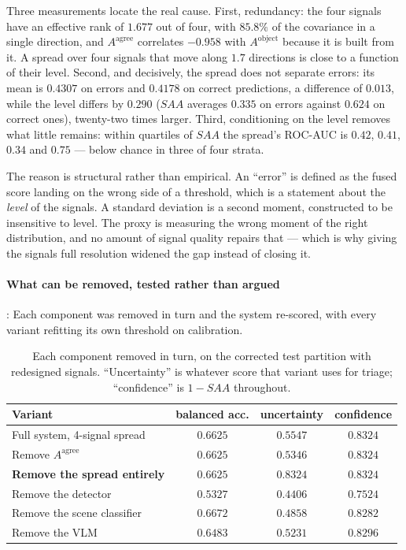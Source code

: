 \documentclass[12pt,a4paper]{report}
\begin{document}
Three measurements locate the real cause. First, redundancy: the four signals have an effective
rank of $\mathbf{1.677}$ out of four, with $85.8\%$ of the covariance in a single direction, and
$A^{\text{agree}}$ correlates $-0.958$ with $A^{\text{object}}$ because it is built from it. A
spread over four signals that move along $1.7$ directions is close to a function of their level.
Second, and decisively, the spread does not separate errors: its mean is $0.4307$ on errors and
$0.4178$ on correct predictions, a difference of $0.013$, while the level differs by $0.290$
($SAA$ averages $0.335$ on errors against $0.624$ on correct ones), twenty-two times larger.
Third, conditioning on the level removes what little remains: within quartiles of $SAA$ the
spread's ROC-AUC is $0.42$, $0.41$, $0.34$ and $0.75$ --- below chance in three of four strata.

The reason is structural rather than empirical. An ``error'' is defined as the fused score landing
on the wrong side of a threshold, which is a statement about the \emph{level} of the signals. A
standard deviation is a second moment, constructed to be insensitive to level. The proxy is
measuring the wrong moment of the right distribution, and no amount of signal quality repairs
that --- which is why giving the signals full resolution widened the gap instead of closing it.

\paragraph{What can be removed, tested rather than argued}: Each component was removed in turn and
the system re-scored, with every variant refitting its own threshold on calibration.

\begin{table}[!htbp]
\centering
\caption[What can be removed from the pipeline]{Each component removed in turn, on the corrected test partition with redesigned signals. ``Uncertainty'' is whatever score that variant uses for triage; ``confidence'' is $1-SAA$ throughout.}
\label{tab:what_can_go}
\small
\begin{tabular}{@{}l c c c@{}}
\toprule
\textbf{Variant} & \textbf{balanced acc.} & \textbf{uncertainty} & \textbf{confidence} \\
\midrule
Full system, 4-signal spread & $0.6625$ & $0.5547$ & $0.8324$ \\
Remove $A^{\text{agree}}$ & $0.6625$ & $0.5346$ & $0.8324$ \\
\textbf{Remove the spread entirely} & $0.6625$ & $\mathbf{0.8324}$ & $0.8324$ \\
Remove the detector & $\mathbf{0.5327}$ & $0.4406$ & $0.7524$ \\
Remove the scene classifier & $0.6672$ & $0.4858$ & $0.8282$ \\
Remove the VLM & $0.6483$ & $0.5231$ & $0.8296$ \\
\bottomrule
\end{tabular}
\end{table}
\end{document}

